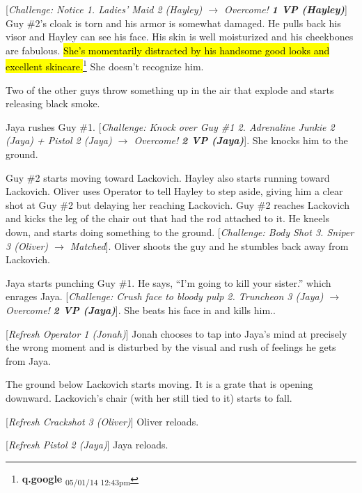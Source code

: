 {[}\textit{Challenge: Notice 1.  Ladies' Maid 2 (Hayley) $\rightarrow$ Overcome! }\textit{\textbf{1 VP (Hayley)}}{]} Guy \#2's cloak is torn and his armor is somewhat damaged.  He pulls back his visor and Hayley can see his face.  His skin is well moisturized and his cheekbones are fabulous.  \hl{She's momentarily distracted by his handsome good looks and excellent skincare.}\footnote{\textbf{q.google } \textsubscript{05/01/14 12:43pm}}  She doesn't recognize him.



Two of the other guys throw something up in the air that explode and starts releasing black smoke.



Jaya rushes Guy \#1.  {[}\textit{Challenge: Knock over Guy \#1 2.  Adrenaline Junkie 2 (Jaya) + Pistol 2 (Jaya)  $\rightarrow$ Overcome! }\textit{\textbf{2 VP (Jaya)}}{]}.  She knocks him to the ground.



Guy \#2 starts moving toward Lackovich.  Hayley also starts running toward Lackovich.  Oliver uses Operator to tell Hayley to step aside, giving him a clear shot at Guy \#2 but delaying her reaching Lackovich.  Guy \#2 reaches Lackovich and kicks the leg of the chair out that had the rod attached to it.  He kneels down, and starts doing something to the ground.  {[}\textit{Challenge: Body Shot 3.  Sniper 3 (Oliver) $\rightarrow$ Matched}{]}.  Oliver shoots the guy and he stumbles back away from Lackovich.



Jaya starts punching Guy \#1.  He says, ``I'm going to kill your sister.'' which enrages Jaya.  {[}\textit{Challenge: Crush face to bloody pulp 2.  Truncheon 3 (Jaya)  $\rightarrow$ Overcome! }\textit{\textbf{2 VP (Jaya)}}{]}.  She beats his face in and kills him..



{[}\textit{Refresh Operator 1 (Jonah)}{]} Jonah chooses to tap into Jaya's mind at precisely the wrong moment and is disturbed by the visual and rush of feelings he gets from Jaya.



The ground below Lackovich starts moving.  It is a grate that is opening downward.  Lackovich's chair (with her still tied to it) starts to fall.  



{[}\textit{Refresh Crackshot 3 (Oliver)}{]}  Oliver reloads.

{[}\textit{Refresh Pistol 2 (Jaya)}{]}  Jaya reloads.



